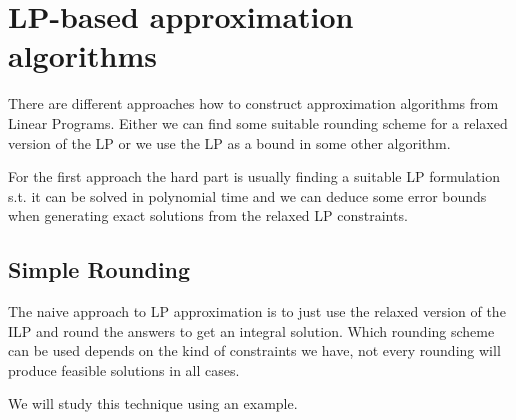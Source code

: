 \section{LP-based approximation algorithms}

There are different approaches how to construct approximation algorithms from Linear Programs. Either we can find some suitable rounding scheme for a relaxed version of the LP or we use the LP as a bound in some other algorithm.

For the first approach the hard part is usually finding a suitable LP formulation s.t. it can be solved in polynomial time and we can deduce some error bounds when generating exact solutions from the relaxed LP constraints.

\subsection{Simple Rounding}

The naive approach to LP approximation is to just use the relaxed version of the ILP and round the answers to get an integral solution. Which rounding scheme can be used depends on the kind of constraints we have, not every rounding will produce feasible solutions in all cases.

We will study this technique using an example.

